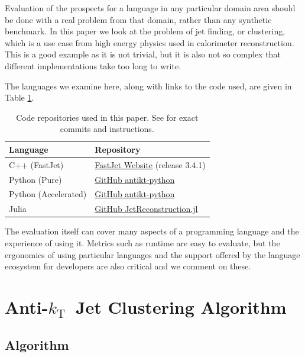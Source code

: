 \documentclass{webofc}
\newcommand{\Akt}{Anti-${k}_\text{T}$}
\begin{document}
Evaluation of the prospects for a language in any particular domain area should
be done with a real problem from that domain, rather than any synthetic
benchmark. In this paper we look at the problem of jet finding, or clustering,
which is a use case from high energy physics used in calorimeter reconstruction.
This is a good example as it is not trivial, but it is also not so complex that
different implementations take too long to write.

The languages we examine here, along with links to the code used, are given in
Table \ref{tab:versions}.

\begin{table}
  \begin{center}
    \begin{tabular}{l|l}
      \textbf{Language} & \textbf{Repository} \\
      \hline
      C++ (FastJet) & \href{https://fastjet.fr/}{FastJet Website} (release 3.4.1) \\
      Python (Pure) & \href{https://github.com/graeme-a-stewart/antikt-python}{GitHub antikt-python} \\
      Python (Accelerated) & \href{https://github.com/graeme-a-stewart/antikt-python}{GitHub antikt-python} \\
      Julia & \href{https://github.com/JuliaHEP/JetReconstruction.jl}{GitHub JetReconstruction.jl} \\
    \end{tabular}
    \caption{Code repositories used in this paper. See \cite{polyglot-jets-zenodo} for exact commits and instructions.}
    \label{tab:versions}
  \end{center}
\end{table}

The evaluation itself can cover many aspects of a programming language and the
experience of using it. Metrics such as runtime are easy to evaluate, but the
ergonomics of using particular languages and the support offered by the language
ecosystem for developers are also critical and we comment on these.

\section{\Akt\ Jet Clustering Algorithm}
\label{sec:antikt}

\subsection{Algorithm}
\label{sec:alg}
\end{document}
